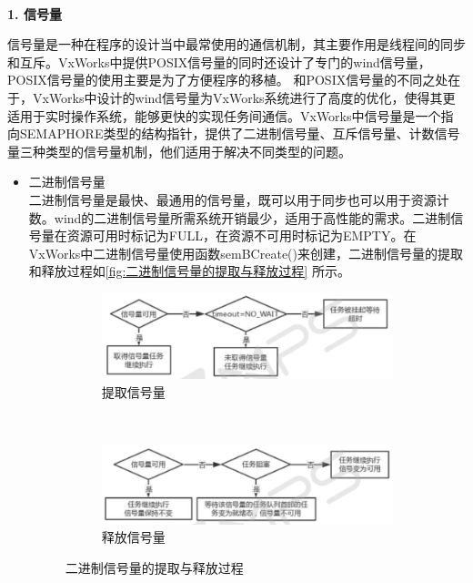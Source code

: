 \\

\noindent \textbf{1. 信号量}
	
	信号量是一种在程序的设计当中最常使用的通信机制，其主要作用是线程间的同步和互斥。VxWorks中提供POSIX信号量的同时还设计了专门的wind信号量，POSIX信号量的使用主要是为了方便程序的移植。
	和POSIX信号量的不同之处在于，VxWorks中设计的wind信号量为VxWorks系统进行了高度的优化，使得其更适用于实时操作系统，能够更快的实现任务间通信。VxWorks中信号量是一个指向SEMAPHORE类型的结构指针，提供了二进制信号量、互斥信号量、计数信号量三种类型的信号量机制，他们适用于解决不同类型的问题。
	
\begin{itemize}
\item 二进制信号量\\
	二进制信号量是最快、最通用的信号量，既可以用于同步也可以用于资源计数。wind的二进制信号量所需系统开销最少，适用于高性能的需求。二进制信号量在资源可用时标记为FULL，在资源不可用时标记为EMPTY。在VxWorks中二进制信号量使用函数semBCreate()来创建，二进制信号量的提取和释放过程如\autoref{fig:二进制信号量的提取与释放过程} 所示。

\begin{figure}[h]
\centering
  \begin{subfigure}[b]{1.0\textwidth}
  \includegraphics[width=\textwidth]{./graphics/erjinzhiTiQu.pdf}
  \caption{提取信号量}\label{fig:cp2102Front}
  \end{subfigure}
  ~
  \begin{subfigure}[b]{1.0\textwidth}
  \includegraphics[width=\textwidth]{./graphics/erjinzhiShiFang.pdf}
  \caption{释放信号量}\label{fig:cp2102Rear}
  \end{subfigure}
\caption{二进制信号量的提取与释放过程}\label{fig:二进制信号量的提取与释放过程}
\end{figure} 



\end{itemize}
